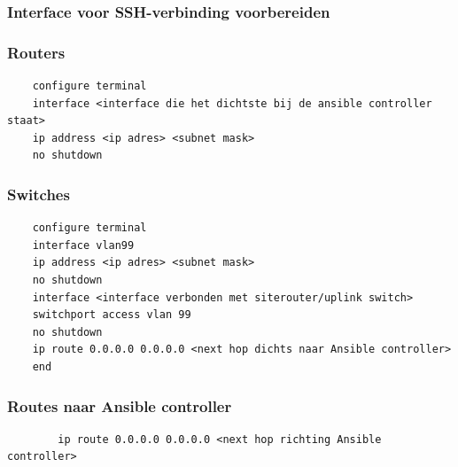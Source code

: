     \subsubsection{Interface voor SSH-verbinding voorbereiden}
    \subsubsection{Routers}
    \begin{listing}[H]
    \caption{Basis interfaceconfiguratie op Cisco IOS routers}
    \label{lst:router-interface-basisconfig}
    \begin{verbatim}    
    configure terminal
    interface <interface die het dichtste bij de ansible controller staat> 
    ip address <ip adres> <subnet mask>
    no shutdown
    \end{verbatim}
    \end{listing}
    \subsubsection{Switches}
    \begin{listing}[H]
    \caption{Basis interfaceconfiguratie op Cisco IOS switches}
    \label{lst:switch-interface-basisconfig}
    \begin{verbatim}    
    configure terminal
    interface vlan99
    ip address <ip adres> <subnet mask>
    no shutdown
    interface <interface verbonden met siterouter/uplink switch>
    switchport access vlan 99
    no shutdown
    ip route 0.0.0.0 0.0.0.0 <next hop dichts naar Ansible controller>
    end
    \end{verbatim}
    \end{listing}

    \subsubsection{Routes naar Ansible controller}
    \begin{listing}[H]
    \caption{Routes naar Ansible controller}
    \label{lst:route-ansiblecontroller}
    \begin{verbatim}   
        ip route 0.0.0.0 0.0.0.0 <next hop richting Ansible controller>
    \end{verbatim}
    \end{listing}

